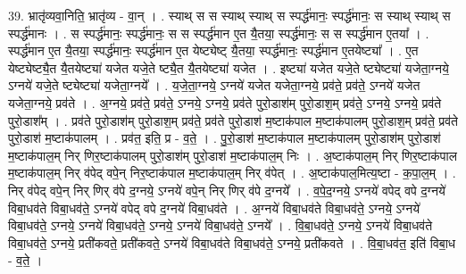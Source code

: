 \documentclass[17pt]{extarticle}
\begin{document}
39. भ्रातृ॑व्यवा॒निति॒ भ्रातृ॑व्य - वा॒न् । . स्याथ् स स स्याथ् स्याथ् स स्पर्द्ध॑मानः॒ स्पर्द्ध॑मानः॒ स स्याथ् स्याथ् स स्पर्द्ध॑मानः । . स स्पर्द्ध॑मानः॒ स्पर्द्ध॑मानः॒ स स स्पर्द्ध॑मान ए॒त यै॒तया॒ स्पर्द्ध॑मानः॒ स स स्पर्द्ध॑मान ए॒तया᳚ । . स्पर्द्ध॑मान ए॒त यै॒तया॒ स्पर्द्ध॑मानः॒ स्पर्द्ध॑मान ए॒त येष्ट्येष्ट् यै॒तया॒ स्पर्द्ध॑मानः॒ स्पर्द्ध॑मान ए॒तयेष्ट्या᳚ । . ए॒त येष्ट्येष्ट्यै॒त यै॒तयेष्ट्या॑ यजेत यजे॒ते ष्ट्यै॒त यै॒तयेष्ट्या॑ यजेत । . इष्ट्या॑ यजेत यजे॒ते ष्ट्येष्ट्या॑ यजेता॒ग्नये॒ ऽग्नये॑ यजे॒ते ष्ट्येष्ट्या॑ यजेता॒ग्नये᳚ । . य॒जे॒ता॒ग्नये॒ ऽग्नये॑ यजेत यजेता॒ग्नये॒ प्रव॑ते॒ प्रव॑ते॒ ऽग्नये॑ यजेत यजेता॒ग्नये॒ प्रव॑ते । . अ॒ग्नये॒ प्रव॑ते॒ प्रव॑ते॒ ऽग्नये॒ ऽग्नये॒ प्रव॑ते पुरो॒डाश॑म् पुरो॒डाश॒म् प्रव॑ते॒ ऽग्नये॒ ऽग्नये॒ प्रव॑ते पुरो॒डाश᳚म् । . प्रव॑ते पुरो॒डाश॑म् पुरो॒डाश॒म् प्रव॑ते॒ प्रव॑ते पुरो॒डाश॑ म॒ष्टाक॑पाल म॒ष्टाक॑पालम् पुरो॒डाश॒म् प्रव॑ते॒ प्रव॑ते पुरो॒डाश॑ म॒ष्टाक॑पालम् । . प्रव॑त॒ इति॒ प्र - व॒ते॒ । . पु॒रो॒डाश॑ म॒ष्टाक॑पाल म॒ष्टाक॑पालम् पुरो॒डाश॑म् पुरो॒डाश॑ म॒ष्टाक॑पाल॒म् निर् णिर॒ष्टाक॑पालम् पुरो॒डाश॑म् पुरो॒डाश॑ म॒ष्टाक॑पाल॒म् निः । . अ॒ष्टाक॑पाल॒म् निर् णिर॒ष्टाक॑पाल म॒ष्टाक॑पाल॒म् निर् व॑पेद् वपे॒न् निर॒ष्टाक॑पाल म॒ष्टाक॑पाल॒म् निर् व॑पेत् । . अ॒ष्टाक॑पाल॒मित्य॒ष्टा - क॒पा॒ल॒म् । . निर् व॑पेद् वपे॒न् निर् णिर् व॑पे द॒ग्नये॒ ऽग्नये॑ वपे॒न् निर् णिर् व॑पे द॒ग्नये᳚ । . व॒पे॒द॒ग्नये॒ ऽग्नये॑ वपेद् वपे द॒ग्नये॑ विबा॒धव॑ते विबा॒धव॑ते॒ ऽग्नये॑ वपेद् वपे द॒ग्नये॑ विबा॒धव॑ते । . अ॒ग्नये॑ विबा॒धव॑ते विबा॒धव॑ते॒ ऽग्नये॒ ऽग्नये॑ विबा॒धव॑ते॒ ऽग्नये॒ ऽग्नये॑ विबा॒धव॑ते॒ ऽग्नये॒ ऽग्नये॑ विबा॒धव॑ते॒ ऽग्नये᳚ । . वि॒बा॒धव॑ते॒ ऽग्नये॒ ऽग्नये॑ विबा॒धव॑ते विबा॒धव॑ते॒ ऽग्नये॒ प्रती॑कवते॒ प्रती॑कवते॒ ऽग्नये॑ विबा॒धव॑ते विबा॒धव॑ते॒ ऽग्नये॒ प्रती॑कवते । . वि॒बा॒धव॑त॒ इति॑ विबा॒ध - व॒ते॒ । \newline
\pagebreak
{}
\end{document}
